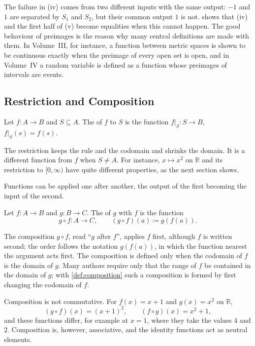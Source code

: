 The failure in (iv) comes from two different inputs with the same output: $-1$ and $1$ are separated by $S_1$ and $S_2$, but their common output $1$ is not.  shows that (iv) and the first half of (v) become equalities when this cannot happen. The good behaviour of preimages is the reason why many central definitions are made with them. In Volume~III, for instance, a function between metric spaces is shown to be continuous exactly when the preimage of every open set is open, and in Volume~IV a random variable is defined as a function whose preimages of intervals are events.

\subsection{Restriction and Composition}

\begin{definition}[Restriction]
\label{def:restriction}
Let $f\colon A\to B$ and $S\subseteq A$. The  of $f$ to $S$ is the function $f|_S\colon S\to B$, $f|_S(s)=f(s)$.
\end{definition}

The restriction keeps the rule and the codomain and shrinks the domain. It is a different function from $f$ when $S\ne A$. For instance, $x\mapsto x^2$ on $\mathbb R$ and its restriction to $[0,\infty)$ have quite different properties, as the next section shows.

Functions can be applied one after another, the output of the first becoming the input of the second.

\begin{definition}[Composition]
\label{def:composition}
Let $f\colon A\to B$ and $g\colon B\to C$. The  of $g$ with $f$ is the function
\[
g\circ f\colon A\to C,\qquad(g\circ f)(a)\coloneqq g(f(a)).
\]
\end{definition}

The composition $g\circ f$, read ``$g$ after $f$'', applies $f$ first, although $f$ is written second; the order follows the notation $g(f(a))$, in which the function nearest the argument acts first. The composition is defined only when the codomain of $f$ is the domain of $g$. Many authors require only that the range of $f$ be contained in the domain of $g$; with \cref{def:composition} such a composition is formed by first changing the codomain of $f$.

Composition is not commutative. For $f(x)=x+1$ and $g(x)=x^2$ on $\mathbb R$,
\[
(g\circ f)(x)=(x+1)^2,\qquad(f\circ g)(x)=x^2+1,
\]
and these functions differ, for example at $x=1$, where they take the values $4$ and $2$. Composition is, however, associative, and the identity functions act as neutral elements.

